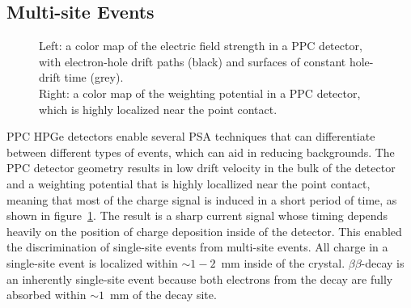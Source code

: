 \documentclass[/main.tex]{subfiles}
\begin{document}
\subsection{Multi-site Events} \label{sec:avse}
\begin{figure}[h]
  \centering
  \caption[Electric field model of a PPC detector]{\label{fig:ppcdet}
    Left: a color map of the electric field strength in a PPC detector, with electron-hole drift paths (black) and surfaces of constant hole-drift time (grey).\\
    Right: a color map of the weighting potential in a PPC detector, which is highly localized near the point contact.
  }
\end{figure}
PPC HPGe detectors enable several PSA techniques that can differentiate between different types of events, which can aid in reducing backgrounds.
The PPC detector geometry results in low drift velocity in the bulk of the detector and a weighting potential that is highly locallized near the point contact, meaning that most of the charge signal is induced in a short period of time, as shown in figure~\ref{fig:ppcdet}.
The result is a sharp current signal whose timing depends heavily on the position of charge deposition inside of the detector.
This enabled the discrimination of single-site events from multi-site events.
All charge in a single-site event is localized within $\sim1-2$~mm inside of the crystal.
$\beta\beta$-decay is an inherently single-site event because both electrons from the decay are fully absorbed within $\sim1$~mm of the decay site.
\end{document}
